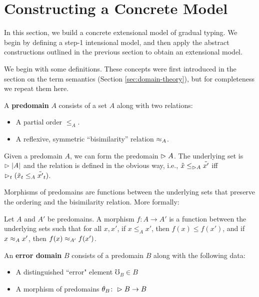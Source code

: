 \section{Constructing a Concrete Model}

In this section, we build a concrete extensional model of gradual typing.
We begin by defining a step-1 intensional model, and then
apply the abstract constructions outlined in the previous section
to obtain an extensional model.

We begin with some definitions. These concepts were first introduced in the section
on the term semantics (Section \ref{sec:domain-theory}), but for completeness we repeat them here.

\begin{definition}
A \textbf{predomain} $A$ consists of a set $A$ along with two relations:
\begin{itemize}
    \item A partial order $\le_A$.
    \item A reflexive, symmetric ``bisimilarity'' relation $\approx_A$.
\end{itemize}
\end{definition}

Given a predomain $A$, we can form the predomain $\vartriangleright A$.
The underlying set is $\vartriangleright |A|$ and the relation is defined in the obvious way,
i.e., $\tilde{x} \le_{\vartriangleright A} \tilde{x'}$ iff $\vartriangleright_t(\tilde{x}_t \le_A \tilde{x'}_t)$.

Morphisms of predomains are functions between the underlying sets that preserve the ordering
and the bisimilarity relation. More formally:
%
\begin{definition}
Let $A$ and $A'$ be predomains.
A morphism $f : A \to A'$ is a function between the underlying sets such that for all $x, x'$,
if $x \le_A x'$, then $f(x) \le f(x')$, and if $x \approx_A x'$, then $f(x) \approx_{A'} f(x')$.
\end{definition}

\begin{definition}
An \textbf{error domain} $B$ consists of a predomain $B$ along with the following data:
\begin{itemize}
    \item A distinguished ``error" element $\mho_B \in B$
    \item A morphism of predomains $\theta_B \colon \vartriangleright B \to B$
\end{itemize}
\end{definition}


